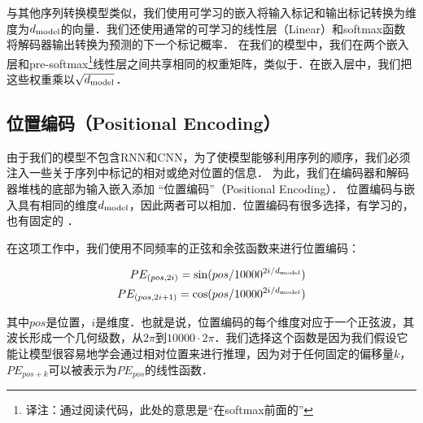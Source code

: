 与其他序列转换模型类似，我们使用可学习的嵌入将输入标记和输出标记转换为维度为$d_{\text{model}}$的向量．我们还使用通常的可学习的线性层（Linear）和softmax函数将解码器输出转换为预测的下一个标记概率． 在我们的模型中，我们在两个嵌入层和pre-softmax\footnote{译注：通过阅读代码，此处的意思是“在softmax前面的”}线性层之间共享相同的权重矩阵，类似于\citep{press2016using}．在嵌入层中，我们把这些权重乘以$\sqrt{d_{\text{model}}}$．

\subsection{位置编码（Positional Encoding）}
由于我们的模型不包含RNN和CNN，为了使模型能够利用序列的顺序，我们必须注入一些关于序列中标记的相对或绝对位置的信息． 为此，我们在编码器和解码器堆栈的底部为输入嵌入添加 “位置编码”（Positional Encoding）． 位置编码与嵌入具有相同的维度$d_{\text{model}}$，因此两者可以相加．位置编码有很多选择，有学习的，也有固定的 \citep{JonasFaceNet2017}．


在这项工作中，我们使用不同频率的正弦和余弦函数来进行位置编码：

\begin{align*}
    PE_{(pos,2i)} = \sin(pos / 10000^{2i/d_{\text{model}}}) \\
    PE_{(pos,2i+1)} = \cos(pos / 10000^{2i/d_{\text{model}}})
\end{align*}


其中$pos$是位置，$i$是维度．也就是说，位置编码的每个维度对应于一个正弦波，其波长形成一个几何级数，从$2\pi$到$10000\cdot 2\pi$．我们选择这个函数是因为我们假设它能让模型很容易地学会通过相对位置来进行推理，因为对于任何固定的偏移量$k$，$PE_{pos+k}$可以被表示为$PE_{pos}$的线性函数．

